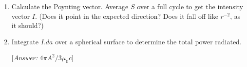 \documentclass[fleqn]{article}
\begin{document}
\begin{enumerate}
\begin{enumerate}

      \item Calculate the Poynting vector. Average $S$ over a full cycle to get the intensity
      vector $I$. (Does it point in the expected direction? Does it fall off like $r^{−2}$, as it
      should?)


      \item Integrate $I.da$ over a spherical surface to determine the total power radiated.
      
      [\emph{Answer:} $4 \pi A^2/3 \mu_0 c$]


    \end{enumerate}

  \end{enumerate}
\end{document}
